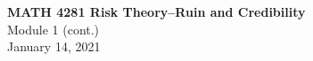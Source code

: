 \documentclass[11pt]{beamer}
\begin{document}
\begin{frame}
  \frametitle{}
  \begin{center}
    \textbf{\large MATH 4281 Risk Theory--Ruin and Credibility}\\
    \vspace{1cm}
    {\large  Module 1 (cont.)} \\
    \vspace{1cm}
    {\large  January 14, 2021}
    \end{center}
    \vspace{1cm}
\end{frame}
\begin{frame}
\tableofcontents
\end{frame}
\end{document}
